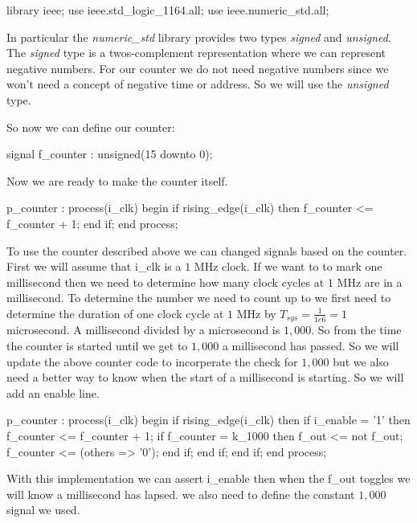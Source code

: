\begin{VHDLlisting}[tabsize=4]
library ieee;
	use ieee.std_logic_1164.all;
	use ieee.numeric_std.all;
\end{VHDLlisting}

In particular the \emph{numeric\_std} library provides two types \emph{signed} and \emph{unsigned}. The \emph{signed} type is a twos-complement representation where we can represent negative numbers. For our counter we do not need negative numbers since we won't need a concept of negative time or address. So we will use the \emph{unsigned} type. 

So now we can define our counter:

\begin{VHDLlisting}[tabsize=4]
signal f_counter : unsigned(15 downto 0);
\end{VHDLlisting}

Now we are ready to make the counter itself.

\begin{VHDLlisting}[tabsize=4]
p_counter : process(i_clk) 
begin
	if rising_edge(i_clk) then
		f_counter <= f_counter + 1;
	end if;
end process;
\end{VHDLlisting}

To use the counter described above we can changed signals based on the counter. First we will assume that i\_clk is a $1$ \ac{MHz} clock. If we want to to mark one millisecond then we need to determine how many clock cycles at $1$ \ac{MHz} are in a millisecond. To determine the number we need to count up to we first need to determine the duration of one clock cycle at $1$ \ac{MHz} by $T_{sys}=\frac{1}{1e6}=1$ microsecond. A millisecond divided by a microsecond is $1,000$. So from the time the counter is started until we get to $1,000$ a millisecond has passed. So we will update the above counter code to incorperate the check for $1,000$ but we also need a better way to know when the start of a millisecond is starting. So we will add an enable line.

\begin{VHDLlisting}[tabsize=4]
p_counter : process(i_clk) 
begin
	if rising_edge(i_clk) then
		if i_enable = '1' then
			f_counter <= f_counter + 1;
			if f_counter = k_1000 then
				f_out <= not f_out;
				f_counter <= (others => '0');
			end if;
		end if;
	end if;
end process;
\end{VHDLlisting}

With this implementation we can assert i\_enable then when the f\_out toggles we will know a millisecond has lapsed. we also need to define the constant $1,000$ signal we used. 


